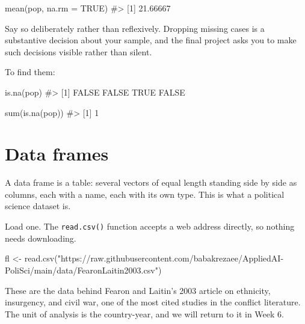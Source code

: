 \documentclass[
  a4paper,
]{scrbook}
\newenvironment{Shaded}{\begin{snugshade}}{\end{snugshade}}
\newcommand{\AttributeTok}[1]{\textcolor[rgb]{0.40,0.45,0.13}{#1}}
\newcommand{\CommentTok}[1]{\textcolor[rgb]{0.37,0.37,0.37}{#1}}
\newcommand{\ConstantTok}[1]{\textcolor[rgb]{0.56,0.35,0.01}{#1}}
\newcommand{\FunctionTok}[1]{\textcolor[rgb]{0.28,0.35,0.67}{#1}}
\newcommand{\NormalTok}[1]{\textcolor[rgb]{0.00,0.23,0.31}{#1}}
\newcommand{\OtherTok}[1]{\textcolor[rgb]{0.00,0.23,0.31}{#1}}
\newcommand{\StringTok}[1]{\textcolor[rgb]{0.13,0.47,0.30}{#1}}
\begin{document}
\begin{Shaded}
\begin{Highlighting}[]
\FunctionTok{mean}\NormalTok{(pop, }\AttributeTok{na.rm =} \ConstantTok{TRUE}\NormalTok{)}
\CommentTok{\#\textgreater{} [1] 21.66667}
\end{Highlighting}
\end{Shaded}

Say so deliberately rather than reflexively. Dropping missing cases is a
substantive decision about your sample, and the final project asks you
to make such decisions visible rather than silent.

To find them:

\begin{Shaded}
\begin{Highlighting}[]
\FunctionTok{is.na}\NormalTok{(pop)}
\CommentTok{\#\textgreater{} [1] FALSE FALSE  TRUE FALSE}

\FunctionTok{sum}\NormalTok{(}\FunctionTok{is.na}\NormalTok{(pop))}
\CommentTok{\#\textgreater{} [1] 1}
\end{Highlighting}
\end{Shaded}

\section*{Data frames}\label{data-frames}


A data frame is a table: several vectors of equal length standing side
by side as columns, each with a name, each with its own type. This is
what a political science dataset is.

Load one. The \texttt{read.csv()} function accepts a web address
directly, so nothing needs downloading.

\begin{Shaded}
\begin{Highlighting}[]
\NormalTok{fl }\OtherTok{\textless{}{-}} \FunctionTok{read.csv}\NormalTok{(}\StringTok{"https://raw.githubusercontent.com/babakrezaee/AppliedAI{-}PoliSci/main/data/FearonLaitin2003.csv"}\NormalTok{)}
\end{Highlighting}
\end{Shaded}

These are the data behind Fearon and Laitin's 2003 article on ethnicity,
insurgency, and civil war, one of the most cited studies in the conflict
literature. The unit of analysis is the country-year, and we will return
to it in Week 6.
\end{document}
